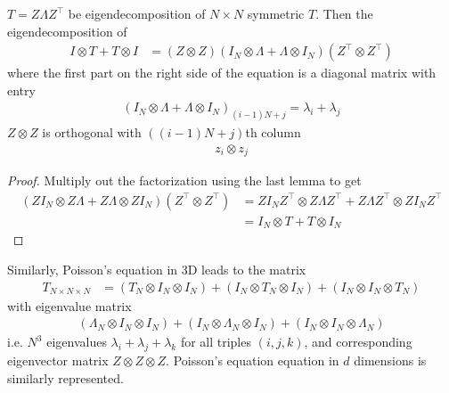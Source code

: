 \documentclass[11pt]{article}
\numberwithin{equation}{section}
\begin{document}
\begin{proposition}
    $T=Z \Lambda Z^{\top}$ be eigendecomposition of $N \times N$ symmetric $T$. Then the eigendecomposition of \begin{align*}
        I \otimes T+T \otimes I &= (Z \otimes Z)(I_N \otimes \Lambda + \Lambda \otimes I_N) (Z^\top \otimes Z^\top)
    \end{align*}
    where the first part on the right side of the equation is a diagonal matrix with entry \begin{align*}
        (I_N \otimes \Lambda + \Lambda \otimes I_N)_{(i-1)N + j} = \lambda_i + \lambda_j
    \end{align*}
    $Z \otimes Z$ is orthogonal with $\left( (i-1)N + j \right)$th column \begin{align*}
        z_i \otimes z_j
    \end{align*}
    \begin{proof}
        Multiply out the factorization using the last lemma to get \begin{align*}
            (ZI_N \otimes Z\Lambda + Z\Lambda \otimes Z I_N)(Z^\top \otimes Z^\top) &= ZI_N Z^\top \otimes Z\Lambda Z^\top + Z\Lambda Z^\top \otimes Z I_N Z^\top \\
            &= I_N \otimes T+T \otimes I_N
        \end{align*}
    \end{proof}
\end{proposition}

Similarly, Poisson's equation in 3D leads to the matrix \begin{align*}
    T_{N\times N\times N} &= \left(T_{N} \otimes I_{N} \otimes {I}_{N}\right) + \left(I_{N} \otimes T_{N} \otimes {I}_{N}\right) + \left(I_{N} \otimes I_{N} \otimes T_{N}\right)
\end{align*}
with eigenvalue matrix \begin{align*}
    \left(\Lambda_{N} \otimes I_{N} \otimes {I}_{N}\right) + \left(I_{N} \otimes \Lambda_{N} \otimes {I}_{N}\right) + \left(I_{N} \otimes I_{N} \otimes \Lambda_{N}\right)
\end{align*}
i.e. $N^3$ eigenvalues $\lambda_i + \lambda_j + \lambda_k$ for all triples $(i,j,k)$, and corresponding eigenvector matrix $Z \otimes Z \otimes Z$.
Poisson's equation equation in $d$ dimensions is similarly represented.
\end{document}

